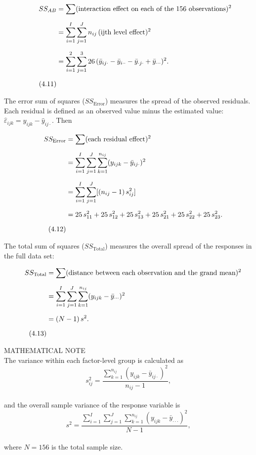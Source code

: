 \documentclass[
]{report}
\theoremstyle{definition}
\theoremstyle{definition}
\theoremstyle{definition}
\theoremstyle{definition}
\theoremstyle{remark}
\begin{document}
\begin{align}
SS_{AB} \notag
  &= \sum (\text{interaction effect on each of the 156 observations})^2 \\[6pt] \notag
  &= \sum_{i=1}^{I}\sum_{j=1}^{J} n_{ij}\,(\text{ijth level effect})^2 \\[6pt] \notag
  &= \sum_{i=1}^{2}\sum_{j=1}^{3} 26\,(\bar y_{ij\cdot} - \bar y_{i\cdot\cdot} - \bar y_{\cdot j \cdot} + \bar y_{\cdot\cdot\cdot})^2. \\[6pt] \tag{4.11}
\end{align}

The error sum of squares (\(SS_{\text{Error}}\)) measures the spread of the observed residuals. Each residual is defined as an observed value minus the estimated value: \(\hat\varepsilon_{ijk} = y_{ijk} - \hat y_{ij\cdot}\). Then

\begin{align}
SS_{\text{Error}} \notag
  &= \sum (\text{each residual effect})^2 \\[6pt] \notag
  &= \sum_{i=1}^{I}\sum_{j=1}^{J}\sum_{k=1}^{n_{ij}} (y_{ijk} - \bar y_{ij\cdot})^2 \\[6pt] \notag
  &= \sum_{i=1}^{I}\sum_{j=1}^{J} [(n_{ij}-1)\,s_{ij}^2] \\[6pt] \notag
  &= 25\,s_{11}^2 + 25\,s_{12}^2 + 25\,s_{13}^2 + 25\,s_{21}^2 + 25\,s_{22}^2 + 25\,s_{23}^2. \\[6pt] \tag{4.12}
\end{align}

The total sum of squares (\(SS_{\text{Total}}\)) measures the overall spread of the responses in the full data set:

\begin{align}
SS_{\text{Total}} \notag
  &= \sum (\text{distance between each observation and the grand mean})^2 \\[6pt] \notag
  &= \sum_{i=1}^{I}\sum_{j=1}^{J}\sum_{k=1}^{n_{ij}} (y_{ijk} - \bar y_{\cdot\cdot\cdot})^2 \\[6pt] \notag
  &= (N-1)\,s^2. \\[6pt] \tag{4.13}
\end{align}

MATHEMATICAL NOTE\\
The variance within each factor-level group is calculated as\\
\[s_{ij}^2 = \frac{\sum_{k=1}^{n_{ij}} (y_{ijk} - \bar y_{ij\cdot})^2}{n_{ij}-1},\]\\
and the overall sample variance of the response variable is\\
\[s^2 = \frac{\sum_{i=1}^I\sum_{j=1}^J\sum_{k=1}^{n_{ij}} (y_{ijk} - \bar y_{\cdot\cdot\cdot})^2}{N-1},\]\\
where \(N = 156\) is the total sample size.
\end{document}
